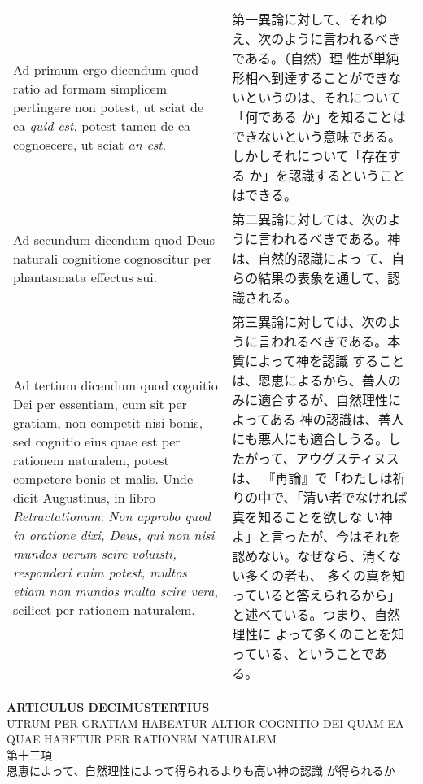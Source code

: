 \documentclass[10pt]{jsarticle} %
\begin{document}
\begin{longtable}{p{21em}p{21em}}
\\



{\sc  Ad primum ergo dicendum} quod ratio ad formam simplicem
 pertingere non potest, ut sciat de ea {\it quid est}, potest tamen de ea
 cognoscere, ut sciat {\it an est}.


&


第一異論に対して、それゆえ、次のように言われるべきである。（自然）理
性が単純形相へ到達することができないというのは、それについて「何である
か」を知ることはできないという意味である。しかしそれについて「存在する
か」を認識するということはできる。

\\



{\sc  Ad secundum dicendum} quod Deus naturali cognitione
 cognoscitur per phantasmata effectus sui.


&

第二異論に対しては、次のように言われるべきである。神は、自然的認識によっ
て、自らの結果の表象を通して、認識される。


\\



{\sc  Ad tertium dicendum} quod cognitio Dei per essentiam, cum
 sit per gratiam, non competit nisi bonis, sed cognitio eius quae est
 per rationem naturalem, potest competere bonis et malis. Unde dicit
 Augustinus, in libro {\it Retractationum}: {\it Non approbo quod in oratione dixi,
 Deus, qui non nisi mundos verum scire voluisti, responderi enim potest,
 multos etiam non mundos multa scire vera}, scilicet per rationem
 naturalem.


&

第三異論に対しては、次のように言われるべきである。本質によって神を認識
することは、恩恵によるから、善人のみに適合するが、自然理性によってある
神の認識は、善人にも悪人にも適合しうる。したがって、アウグスティヌスは、
『再論』で「わたしは祈りの中で、「清い者でなければ真を知ることを欲しな
い神よ」と言ったが、今はそれを認めない。なぜなら、清くない多くの者も、
多くの真を知っていると答えられるから」と述べている。つまり、自然理性に
よって多くのことを知っている、ということである。


\end{longtable}

\newpage
{}

\begin{center}
 {\Large {\bf ARTICULUS DECIMUSTERTIUS}}\\
{\large UTRUM PER GRATIAM HABEATUR ALTIOR COGNITIO DEI QUAM EA QUAE
 HABETUR PER RATIONEM NATURALEM}\\
{\large 第十三項\\恩恵によって、自然理性によって得られるよりも高い神の認識
 が得られるか}
\end{center}
\end{document}
